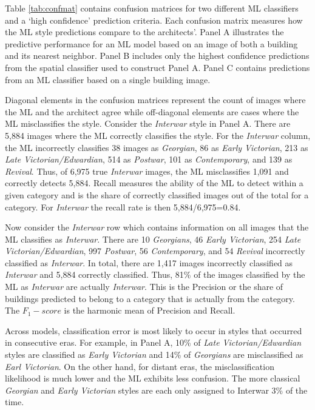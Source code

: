 \documentclass[]{article}
\begin{document}
Table \ref{tab:confmat} contains confusion matrices for two different ML classifiers and a `high confidence' prediction criteria. Each confusion matrix measures how the ML style predictions compare to the architects'. Panel A illustrates the predictive performance for an ML model based on an image of both a building and its nearest neighbor. Panel B includes only the highest confidence predictions from the spatial classifier used to construct Panel A. Panel C contains predictions from an ML classifier based on a single building image. 

Diagonal elements in the confusion matrices represent the count of images where the ML and the architect agree while off-diagonal elements are cases where the ML misclassifies the style. Consider the \emph{Interwar} style in Panel A. There are 5,884 images where the ML correctly classifies the style. For the \emph{Interwar} column, the ML incorrectly classifies 38 images as \emph{Georgian}, 86 as \emph{Early Victorian},  213 as \emph{Late Victorian/Edwardian}, 514 as \emph{Postwar}, 101 as \emph{Contemporary}, and 139 as \emph{Revival}. Thus, of 6,975 true \emph{Interwar} images, the ML misclassifies 1,091 and correctly detects 5,884. Recall measures the ability of the ML to detect within a given category and is the share of correctly classified images out of the total for a category. For \emph{Interwar} the recall rate is then 5,884/6,975=0.84. 

Now consider the \emph{Interwar} row which contains information on all images that the ML classifies as \emph{Interwar}. There are 10 \emph{Georgians}, 46 \emph{Early Victorian}, 254 \emph{Late Victorian/Edwardian}, 997 \emph{Postwar}, 56 \emph{Contemporary}, and 54 \emph{Revival} incorrectly classified as \emph{Interwar}. In total, there are 1,417 images incorrectly classified as \emph{Interwar} and 5,884 correctly classified. Thus, 81\% of the images classified by the ML as \emph{Interwar} are actually \emph{Interwar}. This is the Precision or the share of buildings predicted to belong to a category that is actually from the category. The $F_1-score$ is the harmonic mean of Precision and Recall. 

Across models, classification error is most likely to occur in styles that occurred in consecutive eras. For example, in Panel A,  10\% of \emph{Late Victorian/Edwardian} styles are classified as \emph{Early Victorian} and 14\% of \emph{Georgians} are misclassified as \emph{Earl Victorian}. On the other hand, for distant eras, the misclassification likelihood is much lower and the ML exhibits less confusion. The more classical \emph{Georgian} and \emph{Early Victorian} styles are each only assigned to Interwar 3\% of the time. 
\end{document}
